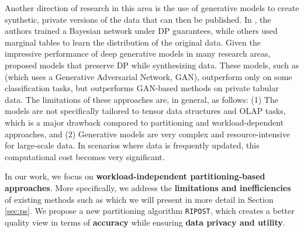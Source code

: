 Another direction of research in this area is the use of generative models to create synthetic, private versions of the data that can then be published.  
In \cite{privbayes}, the authors trained a Bayesian network under DP guarantees, while others \cite{dppro,privsyn,priview} used marginal tables to learn the distribution of the original data.
Given the impressive performance of deep generative models in many research areas, \cite{gan,gan1,gan2,gan3,p3gm} proposed models that preserve DP while synthesizing data. 
These models, such as \cite{gan} (which uses a Generative Adversarial Network, GAN), outperform \cite{privbayes} only on some classification tasks, but \cite{privbayes} outperforms GAN-based methods on private tabular data. 
The limitations of these approaches are, in general, as follows: (1) The models are not specifically tailored to tensor data structures and OLAP tasks, which is a major drawback compared to partitioning and workload-dependent approaches, and (2) Generative models are very complex and resource-intensive for large-scale data. In scenarios where data is frequently updated, this computational cost becomes very significant.\medskip

In our work, we focus on \textbf{workload-independent partitioning-based approaches}. 
More specifically, we address the \textbf{limitations and inefficiencies} of existing methods such as \cite{hdpview,privtree,cormode} which we will present in more detail in Section \ref{sec:ps}. 
We propose a new partitioning algorithm \texttt{RIPOST}, which creates a better quality view in terms of \textbf{accuracy} while ensuring \textbf{data privacy and utility}.


